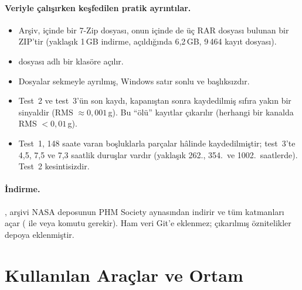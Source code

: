 \documentclass[11pt]{article}
\begin{document}
\paragraph{Veriyle çalışırken keşfedilen pratik ayrıntılar.}
\begin{itemize}
  \item Arşiv, içinde bir 7-Zip dosyası, onun içinde de üç RAR dosyası bulunan bir ZIP'tir (yaklaşık
        1\,GB indirme, açıldığında 6,2\,GB, 9\,464 kayıt dosyası).
  \item {} dosyası  adlı bir klasöre açılır.
  \item Dosyalar sekmeyle ayrılmış, Windows satır sonlu ve başlıksızdır.
  \item Test~2 ve test~3'ün son kaydı, kapanıştan sonra kaydedilmiş sıfıra yakın bir sinyaldir
        (RMS $\approx 0{,}001$\,g). Bu ``ölü'' kayıtlar çıkarılır (herhangi bir kanalda
        RMS $< 0{,}01$\,g).
  \item Test~1, 148 saate varan boşluklarla parçalar hâlinde kaydedilmiştir; test~3'te 4,5, 7,5 ve 7,3
        saatlik duruşlar vardır (yaklaşık 262., 354.\ ve 1002.\ saatlerde). Test~2 kesintisizdir.
\end{itemize}

\paragraph{İndirme.} , arşivi NASA deposunun PHM Society aynasından
indirir ve tüm katmanları açar ( ile  veya  komutu gerekir). Ham veri
Git'e eklenmez; çıkarılmış öznitelikler depoya eklenmiştir.

\section{Kullanılan Araçlar ve Ortam}
\end{document}
